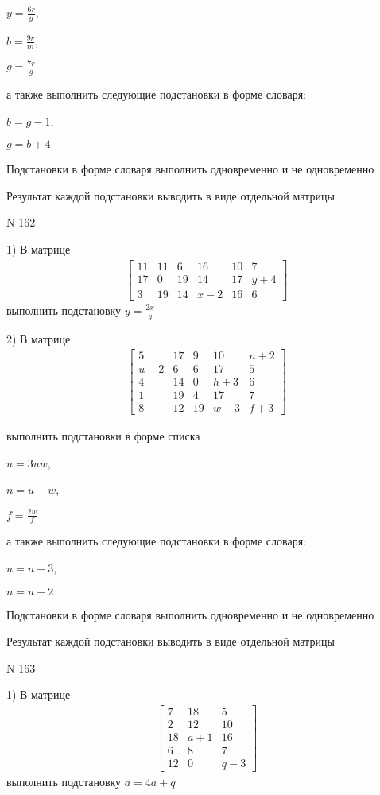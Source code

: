 \documentclass[11pt]{report}
\begin{document}
$y=\frac{6 r}{g}$,

$b=\frac{9 r}{m}$,

$g=\frac{7 r}{g}$

а также выполнить следующие подстановки в форме словаря:

$b=g - 1$,

$g=b + 4$


    Подстановки в форме словаря выполнить одновременно и не одновременно


    Результат каждой подстановки выводить в виде отдельной матрицы

\newpage
N 162


    1) В матрице
\begin{align*}
\left[\begin{matrix}11 & 11 & 6 & 16 & 10 & 7\\17 & 0 & 19 & 14 & 17 & y + 4\\3 & 19 & 14 & x - 2 & 16 & 6\end{matrix}\right]
\end{align*}
выполнить подстановку $y=\frac{2 x}{y}$


    2) В матрице
\begin{align*}
\left[\begin{matrix}5 & 17 & 9 & 10 & n + 2\\u - 2 & 6 & 6 & 17 & 5\\4 & 14 & 0 & h + 3 & 6\\1 & 19 & 4 & 17 & 7\\8 & 12 & 19 & w - 3 & f + 3\end{matrix}\right]
\end{align*}

выполнить подстановки в форме списка

$u=3 u w$,

$n=u + w$,

$f=\frac{2 w}{f}$

а также выполнить следующие подстановки в форме словаря:

$u=n - 3$,

$n=u + 2$


    Подстановки в форме словаря выполнить одновременно и не одновременно


    Результат каждой подстановки выводить в виде отдельной матрицы

\newpage
N 163


    1) В матрице
\begin{align*}
\left[\begin{matrix}7 & 18 & 5\\2 & 12 & 10\\18 & a + 1 & 16\\6 & 8 & 7\\12 & 0 & q - 3\end{matrix}\right]
\end{align*}
выполнить подстановку $a=4 a + q$
\end{document}
